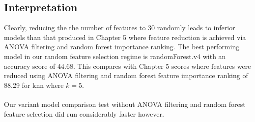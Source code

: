 \documentclass{article}
\begin{document}
\subsection*{Interpretation}
Clearly, reducing the the number of features to 30 randomly leads to inferior models than that produced in Chapter 5 where feature reduction is achieved via ANOVA filtering and random forest importance ranking. The best performing model in our random feature selection regime is randomForest.v4 with an accuracy score of 44.68. This compares with Chapter 5 scores where features were reduced using ANOVA filtering and random forest feature importance ranking of 88.29 for knn where $k =5$.   
\\
\\
Our variant model comparison test without ANOVA filtering and random forest feature selection did run considerably faster however. 
\end{document}
